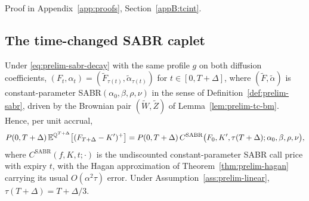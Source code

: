 \documentclass[../../../main.tex]{subfiles}
\begin{document}
Proof in Appendix~\ref{app:proofs}, Section~\ref{appB:tcint}.

\subsection{The time-changed SABR caplet}

\begin{lemma}\label{lem:prelim-tc}
Under \eqref{eq:prelim-sabr-decay} with the same profile $g$ on both diffusion coefficients, $(F_t,\alpha_t)=(\tilde F_{\tau(t)},\tilde\alpha_{\tau(t)})$ for $t\in[0,T+\Delta]$, where $(\tilde F,\tilde\alpha)$ is constant-parameter SABR$(\alpha_0,\beta,\rho,\nu)$ in the sense of Definition~\ref{def:prelim-sabr}, driven by the Brownian pair $(\tilde W,\tilde Z)$ of Lemma~\ref{lem:prelim-tc-bm}. Hence, per unit accrual,
\begin{equation}\label{eq:prelim-tc-price}
P(0,T+\Delta)\,\mathbb{E}^{\mathbb{Q}^{T+\Delta}}\big[(F_{T+\Delta}-K')^+\big]=P(0,T+\Delta)\,C^{\mathrm{SABR}}\big(F_0,K',\tau(T+\Delta);\alpha_0,\beta,\rho,\nu\big),
\end{equation}
where $C^{\mathrm{SABR}}(f,K,t;\cdot)$ is the undiscounted constant-parameter SABR call price with expiry $t$, with the Hagan approximation of Theorem~\ref{thm:prelim-hagan} carrying its usual $O(\alpha^2\tau)$ error. Under Assumption~\ref{ass:prelim-linear}, $\tau(T+\Delta)=T+\Delta/3$.
\end{lemma}
\end{document}
